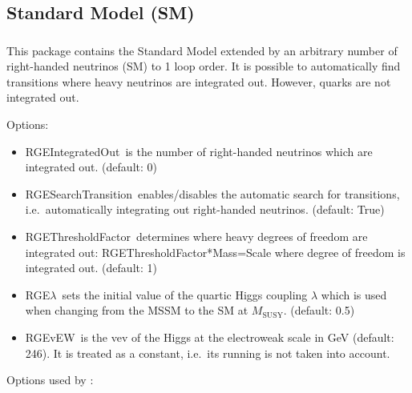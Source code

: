 \documentclass[10pt,a4paper,twoside]{scrartcl}
\begin{document}
\subsection{Standard Model (SM)}

\subsubsection[\package{RGESM}]{}
This package contains the Standard Model extended by an arbitrary number of right-handed neutrinos (SM)
to 1 loop order.  It is possible to automatically find transitions where heavy
neutrinos are integrated out.  However, quarks are not integrated out.

\vspace{2ex}
Options:
\begin{itemize}
\item RGEIntegratedOut\ is the number of right-handed neutrinos which are
  integrated out. (default: 0)
\item RGESearchTransition\ enables/disables the automatic search for
  transitions, i.e.\ automatically integrating out right-handed
neutrinos. (default: True)
\item RGEThresholdFactor\ determines where heavy degrees of freedom are integrated
  out: RGEThresholdFactor*Mass=Scale where degree of freedom is integrated
  out. (default: 1)
\item RGE$\lambda$\ sets the initial value of the quartic Higgs coupling
  $\lambda$ which is used when changing from the MSSM to the SM at
  $M_\mathrm{SUSY}$.  (default: 0.5)
\item RGEvEW\ is the vev of the Higgs at the electroweak scale
  in GeV (default: 246).  It is treated as a constant, i.e.\ its running
  is not taken into account.

\end{itemize}

Options used by :
\end{document}
